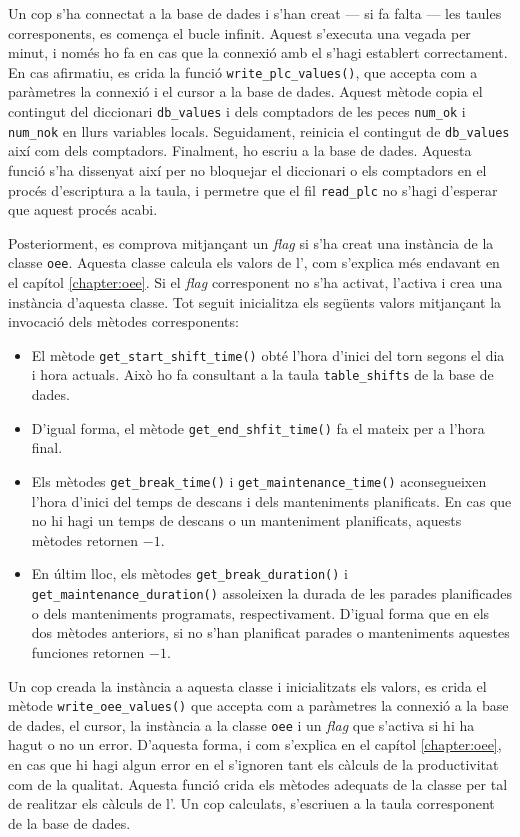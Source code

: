 \documentclass{tfgitic}[2022/06/30]
\begin{document}
Un cop s'ha connectat a la base de dades i s'han creat --- si fa falta --- les taules corresponents, es comença el bucle infinit. Aquest s'executa una vegada per minut, i només ho fa en cas que la connexió amb el  s'hagi establert correctament. En cas afirmatiu, es crida la funció \texttt{write\_plc\_values()}, que accepta com a paràmetres la connexió i el cursor a la base de dades. Aquest mètode copia el contingut del diccionari \texttt{db\_values} i dels comptadors de les peces \texttt{num\_ok} i \texttt{num\_nok} en llurs variables locals. Seguidament, reinicia el contingut de \texttt{db\_values} així com dels comptadors. Finalment, ho escriu a la base de dades. Aquesta funció s'ha dissenyat així per no bloquejar el diccionari o els comptadors en el procés d'escriptura a la taula, i permetre que el fil \texttt{read\_plc} no s'hagi d'esperar que aquest procés acabi.

Posteriorment, es comprova mitjançant un \emph{flag} si s'ha creat una instància de la classe \texttt{oee}. Aquesta classe calcula els valors de l', com s'explica més endavant en el capítol \ref{chapter:oee}. Si el \emph{flag} corresponent no s'ha activat, l'activa i crea una instància d'aquesta classe. Tot seguit inicialitza els següents valors mitjançant la invocació dels mètodes corresponents:

\begin{itemize}
    \item El mètode \texttt{get\_start\_shift\_time()} obté l'hora d'inici del torn segons el dia i hora actuals. Això ho fa consultant a la taula \texttt{table\_shifts} de la base de dades.
    \item D'igual forma, el mètode \texttt{get\_end\_shfit\_time()} fa el mateix per a l'hora final.
    \item Els mètodes \texttt{get\_break\_time()} i \texttt{get\_maintenance\_time()} aconsegueixen l'hora d'inici del temps de descans i dels manteniments planificats. En cas que no hi hagi un temps de descans o un manteniment planificats, aquests mètodes retornen $-1$.
    \item En últim lloc, els mètodes \texttt{get\_break\_duration()} i \texttt{get\_maintenance\_duration()} assoleixen la durada de les parades planificades o dels manteniments programats, respectivament. D'igual forma que en els dos mètodes anteriors, si no s'han planificat parades o manteniments aquestes funciones retornen $-1$.
\end{itemize}

Un cop creada la instància a aquesta classe i inicialitzats els valors, es crida el mètode \texttt{write\_oee\_values()} que accepta com a paràmetres la connexió a la base de dades, el cursor, la instància a la classe \texttt{oee} i un \emph{flag} que s'activa si hi ha hagut o no un error. D'aquesta forma, i com s'explica en el capítol \ref{chapter:oee}, en cas que hi hagi algun error en el  s'ignoren tant els càlculs de la productivitat com de la qualitat. Aquesta funció crida els mètodes adequats de la classe per tal de realitzar els càlculs de l'. Un cop calculats, s'escriuen a la taula corresponent de la base de dades.
\end{document}
